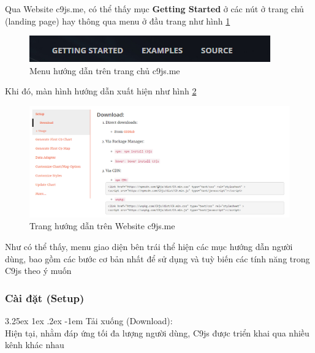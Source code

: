 \documentclass[12pt,a4paper]{article}
\makeatletter
\newcommand{\myparagraph}[1]{\paragraph{#1}\mbox{}\\} %
\renewcommand\paragraph{\@startsection{paragraph}{5}{\z@}%
  {3.25ex \@plus1ex \@minus.2ex}%
  {-1em}%
  {\normalfont\normalsize\bfseries}}
\makeatother
\begin{document}
Qua Website c9js.me, có thể thấy mục \textbf{Getting Started} ở các nút ở trang chủ (landing page) hay thông qua menu ở đầu trang như hình \ref{fig:getting_started}

\begin{figure}[htp]
	\begin{center}
    \includegraphics[scale=.8]{image/getting_started}
    \caption{Menu hướng dẫn trên trang chủ c9js.me}
    \label{fig:getting_started}
	\end{center}
\end{figure}

Khi đó, màn hình hướng dẫn xuất hiện như hình \ref{fig:gs_1}
\begin{figure}[htp]
	\begin{center}
    \includegraphics[scale=.5]{image/gs_1}
    \caption{Trang hướng dẫn trên Website c9js.me}
    \label{fig:gs_1}
	\end{center}
\end{figure}

Như có thể thấy, menu giao diện bên trái thể hiện các mục hướng dẫn người dùng, bao gồm các bước cơ bản nhất để sử dụng và tuỳ biến các tính năng trong C9js theo ý muốn

\subsubsection{Cài đặt (Setup)}
\myparagraph{Tải xuống (Download):}
Hiện tại, nhằm đáp ứng tối đa lượng người dùng, C9js được triển khai qua nhiều kênh khác nhau
\end{document}
